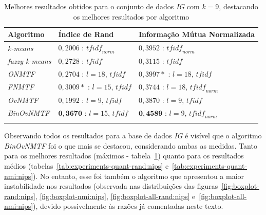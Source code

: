 \documentclass[
    12pt,                %
    oneside,            %
    a4paper,            %
    english,            %
    brazil                %
    ]{abntex2ppgsi}
\begin{document}
\begin{table}[H]
\centering
    \caption{Melhores resultados obtidos para o conjunto de dados \textit{IG} com $k = 9$, destacando os melhores resultados por algoritmo}
    \begin{tabular}{lll}
        \hline
        \textbf{Algoritmo}              & \textbf{Índice de Rand} & \textbf{Informação Mútua Normalizada} \\
        \hline
        \textit{k-means}       & $0,2006$ : $\textit{tfidf}_{norm}$           & $0,3952$ : $\textit{tfidf}_{norm}$ \\
        \textit{fuzzy k-means} & $0,2728$ : $\textit{tfidf}$                  & $0,3115$ : $\textit{tfidf}$ \\
        \textit{ONMTF}         & $0,2704$ : $l=18$, $\textit{tfidf}$          & $0,3997*$ : $l=18$, $\textit{tfidf}$\\
        \textit{FNMTF}         & $0,3009*$ : $l=15$, $\textit{tfidf}$         & $0,3744$ : $l=18$, $\textit{tfidf}_{norm}$ \\
        \textit{OvNMTF}        & $0,1992$ : $l=9$, $\textit{tfidf}$           & $0,3870$ : $l=9$, $\textit{tfidf}$\\
        \textit{BinOvNMTF}     & $\mathbf{0,3670}$ : $l=15$, $\textit{tfidf}$ & $\mathbf{0,4589}$ : $l=9$, $\textit{tfidf}_{norm}$ \\
        \hline \\
    \end{tabular}
    \label{tab:experiments-quant-best-nmi:nips}
\end{table}

Observando todos os resultados para a base de dados \textit{IG} é visível que o algoritmo \textit{BinOvNMTF} foi o que mais se destacou, considerando ambas as medidas.
Tanto para os melhores resultados (máximos - tabela~\ref{tab:experiments-quant-best-nmi:nips}) quanto para os resultados médios (tabelas~\ref{tab:experiments-quant-rand:nips} e~\ref{tab:experiments-quant-nmi:nips}). No entanto, esse foi também o algoritmo que apresentou a maior instabilidade nos resultados (observada nas distribuições das figuras~\ref{fig:boxplot-rand:nips}, \ref{fig:boxplot-nmi:nips}, \ref{fig:boxplot-all-rand:nips} e~\ref{fig:boxplot-all-nmi:nips}), devido possivelmente às razões já comentadas neste texto. %
\end{document}
